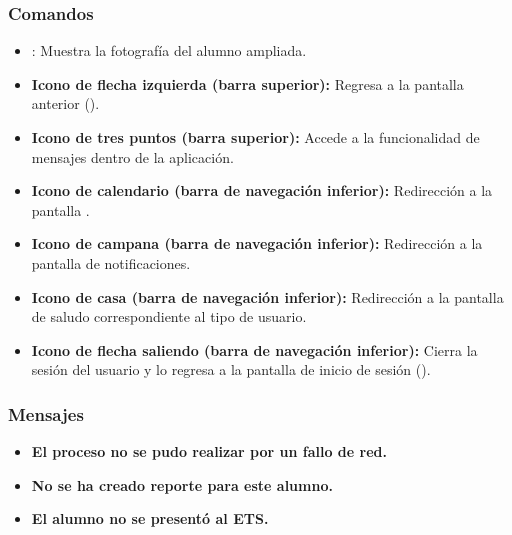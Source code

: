 \subsubsection{Comandos}
\begin{itemize}
	\item {}: Muestra la fotografía del alumno ampliada.
	\item \textbf{Icono de flecha izquierda (barra superior):} Regresa a la pantalla anterior ().
	\item \textbf{Icono de tres puntos (barra superior):} Accede a la funcionalidad de mensajes dentro de la aplicación.
	\item \textbf{Icono de calendario (barra de navegación inferior):} Redirección a la pantalla .
	\item \textbf{Icono de campana (barra de navegación inferior):} Redirección a la pantalla de notificaciones.
	\item \textbf{Icono de casa (barra de navegación inferior):} Redirección a la pantalla de saludo correspondiente al tipo de usuario.
	\item \textbf{Icono de flecha saliendo (barra de navegación inferior):} Cierra la sesión del usuario y lo regresa a la pantalla de inicio de sesión ().
\end{itemize}

\subsubsection{Mensajes}
\begin{itemize}
	\item \textbf{El proceso no se pudo realizar por un fallo de red.}
	\item \textbf{No se ha creado reporte para este alumno.}
	\item \textbf{El alumno no se presentó al ETS.}
\end{itemize}
